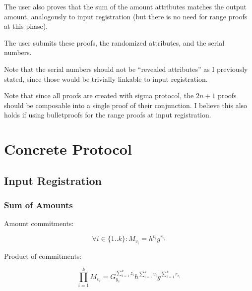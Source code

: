 \documentclass{article}
\begin{document}
The user also proves that the sum of the amount attributes matches the output amount, analogously to input registration (but there is no need for range proofs at this phase).

The user submits these proofs, the randomized attributes, and the serial numbers.

Note that the serial numbers should not be ``revealed attributes'' as I previously stated, since those would be trivially linkable to input registration.

Note that since all proofs are created with sigma protocol, the $2n+1$ proofs should be composable into a single proof of their conjunction.
I believe this also holds if using bulletproofs for the range proofs at input registration.

\section{Concrete Protocol}





\subsection{Input Registration}

\subsubsection{Sum of Amounts}

Amount commitments:

\[ \forall i \in \{1..k\}: M_{v_i}=h^{v_i}g^{r_{v_i}} \]

Product of commitments:

\[\prod_{i=1}^{k} M_{v_i}
= G^{\sum_{i=1}^{k} z_i}_{y_{v}}h^{\sum_{i=1}^{k} v_i}g^{\sum_{i=1}^{k} r_{v_i}}
\]
\end{document}
